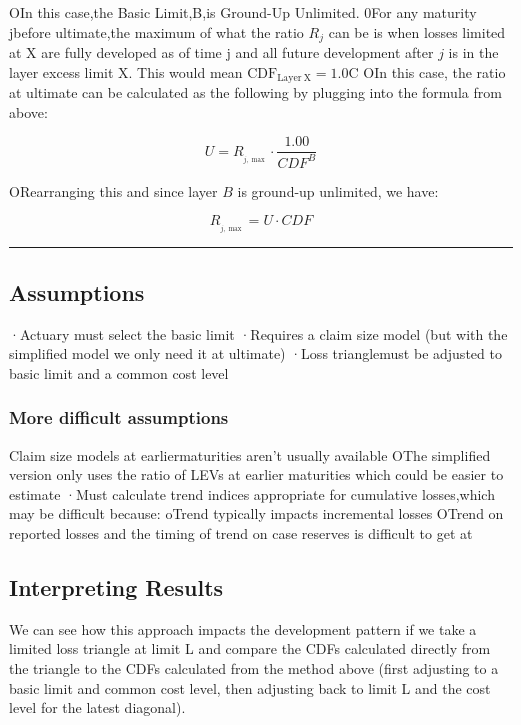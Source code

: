 \documentclass[
]{article}
\begin{document}
OIn this case,the Basic Limit,B,is Ground-Up Unlimited. 0For any
maturity jbefore ultimate,the maximum of what the ratio \(R_{j}\) can be
is when losses limited at X are fully developed as of time j and all
future development after \(j\) is in the layer excess limit X. This
would mean \(\mathrm{CDF}_{\mathrm{Layer~X}}=1.0\)C OIn this case, the
ratio at ultimate can be calculated as the following by plugging into
the formula from above:

\[U=R_{_{j,\max}}\cdot\frac{1.00}{CDF^B}\]

ORearranging this and since layer \(B\) is ground-up unlimited, we have:

\[R_{_{j,\max}}=U\cdot CDF\]

\begin{center}\rule{0.5\linewidth}{0.5pt}\end{center}

\subsection{Assumptions}\label{assumptions}

·Actuary must select the basic limit ·Requires a claim size model (but
with the simplified model we only need it at ultimate) ·Loss
trianglemust be adjusted to basic limit and a common cost level

\subsubsection{More difficult
assumptions}\label{more-difficult-assumptions}

Claim size models at earliermaturities aren't usually available OThe
simplified version only uses the ratio of LEVs at earlier maturities
which could be easier to estimate ·Must calculate trend indices
appropriate for cumulative losses,which may be difficult because: oTrend
typically impacts incremental losses OTrend on reported losses and the
timing of trend on case reserves is difficult to get at

\subsection{Interpreting Results}\label{interpreting-results}

We can see how this approach impacts the development pattern if we take
a limited loss triangle at limit L and compare the CDFs calculated
directly from the triangle to the CDFs calculated from the method above
(first adjusting to a basic limit and common cost level, then adjusting
back to limit L and the cost level for the latest diagonal).
\end{document}

